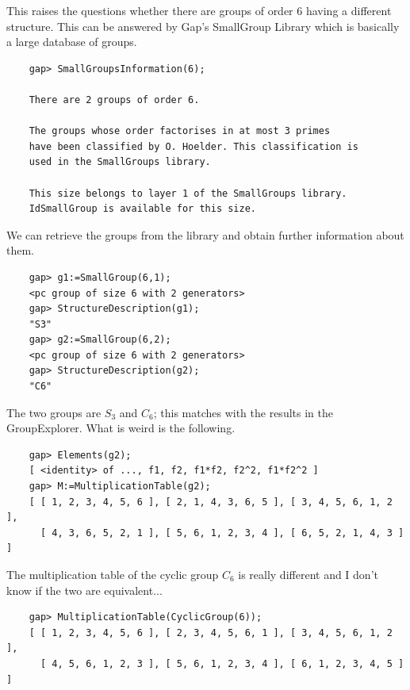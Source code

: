 This raises the questions whether there are groups of order $6$ having a different structure. This can be answered by Gap's SmallGroup Library which is basically a large database of groups.

\begin{verbatim}
    gap> SmallGroupsInformation(6);

    There are 2 groups of order 6.

    The groups whose order factorises in at most 3 primes 
    have been classified by O. Hoelder. This classification is 
    used in the SmallGroups library. 

    This size belongs to layer 1 of the SmallGroups library. 
    IdSmallGroup is available for this size. 
\end{verbatim}

We can retrieve the groups from the library and obtain further information about them.

\begin{verbatim}
    gap> g1:=SmallGroup(6,1);
    <pc group of size 6 with 2 generators>
    gap> StructureDescription(g1);
    "S3"
    gap> g2:=SmallGroup(6,2);
    <pc group of size 6 with 2 generators>
    gap> StructureDescription(g2);
    "C6"
\end{verbatim}

The two groups are $S_3$ and $C_6$; this matches with the results in the GroupExplorer. What is weird is the following.

\begin{verbatim}
    gap> Elements(g2);
    [ <identity> of ..., f1, f2, f1*f2, f2^2, f1*f2^2 ]
    gap> M:=MultiplicationTable(g2);
    [ [ 1, 2, 3, 4, 5, 6 ], [ 2, 1, 4, 3, 6, 5 ], [ 3, 4, 5, 6, 1, 2 ], 
      [ 4, 3, 6, 5, 2, 1 ], [ 5, 6, 1, 2, 3, 4 ], [ 6, 5, 2, 1, 4, 3 ] ]
\end{verbatim}

The multiplication table of the cyclic group $C_6$ is really different and I don't know if the two are equivalent...

\begin{verbatim}
    gap> MultiplicationTable(CyclicGroup(6));
    [ [ 1, 2, 3, 4, 5, 6 ], [ 2, 3, 4, 5, 6, 1 ], [ 3, 4, 5, 6, 1, 2 ], 
      [ 4, 5, 6, 1, 2, 3 ], [ 5, 6, 1, 2, 3, 4 ], [ 6, 1, 2, 3, 4, 5 ] ]
\end{verbatim}



